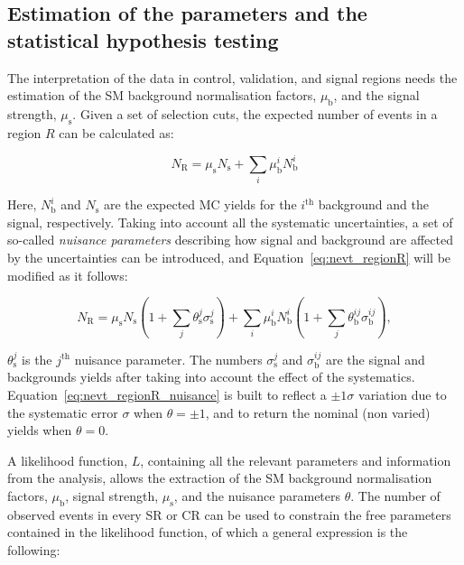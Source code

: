 		\subsection{Estimation of the parameters and the statistical hypothesis testing}

			The interpretation of the data in control, validation, and signal regions needs the estimation of the \ac{SM} background normalisation factors, $\mu_\mathrm{b}$, and the signal strength, $\mu_\mathrm{s}$. Given a set of selection cuts, the expected number of events in a region $R$ can be calculated as: 

			\begin{equation}
				N_{\mathrm{R}} = \mu_\mathrm{s} N_{\mathrm{s}} + \sum_i \mu_\mathrm{b}^i N_{\mathrm{b}}^i
			\label{eq:nevt_regionR}
			\end{equation}

			\noindent Here, $N_{\mathrm{b}}^i$ and $N_{\mathrm{s}}$ are the expected \ac{MC} yields for the $i^{\mathrm{th}}$ background and the signal, respectively. Taking into account all the systematic uncertainties, a set of so-called \emph{nuisance parameters} describing how signal and background are affected by the uncertainties can be introduced, and Equation~\ref{eq:nevt_regionR} will be modified as it follows:

			\begin{equation} 
				N_{\mathrm{R}} = \mu_\mathrm{s} N_{\mathrm{s}} \left ( 1 + \sum_j \theta_\mathrm{s}^j \sigma_\mathrm{s}^j \right ) + \sum_i \mu_\mathrm{b}^i N_{\mathrm{b}}^i \left ( 1 + \sum_j \theta_\mathrm{b}^{ij} \sigma_\mathrm{b}^{ij} \right ),
			\label{eq:nevt_regionR_nuisance}
			\end{equation} 

			\noindent $\theta_\mathrm{s}^j$ is the $j^{\mathrm{th}}$ nuisance parameter. The numbers $\sigma_\mathrm{s}^j$ and $\sigma_\mathrm{b}^{ij}$ are the signal and backgrounds yields after taking into account the effect of the systematics. Equation~\ref{eq:nevt_regionR_nuisance} is built to reflect a $\pm 1 \sigma$ variation due to the systematic error $\sigma$ when $\theta = \pm 1$, and to return the nominal (non varied) yields when $\theta = 0$. %

			A likelihood function, $L$, containing all the relevant parameters and information from the analysis, allows the extraction of the \ac{SM} background normalisation factors, $\mu_\mathrm{b}$, signal strength, $\mu_\mathrm{s}$, and the nuisance parameters $\theta$. The number of observed events in every \ac{SR} or \ac{CR} can be used to constrain the free parameters contained in the likelihood function, of which a general expression is the following:

